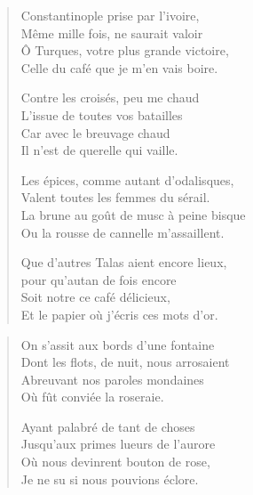 \begin{verse}
Constantinople prise par l’ivoire,\\
Même mille fois, ne saurait valoir\\
Ô Turques, votre plus grande victoire,\\
Celle du café que je m’en vais boire.

Contre les croisés, peu me chaud\\
L’issue de toutes vos batailles\\
Car avec le breuvage chaud\\
Il n’est de querelle qui vaille.

Les épices, comme autant d’odalisques,\\
Valent toutes les femmes du sérail.\\
La brune au goût de musc à peine bisque\\
Ou la rousse de cannelle m’assaillent.

Que d’autres Talas aient encore lieux,\\
 pour qu’autan de fois encore\\
Soit notre ce café délicieux,\\
Et le papier où j’écris ces mots d’or.
\end{verse}

\begin{verse}
On s’assit aux bords d’une fontaine\\
Dont les flots, de nuit, nous arrosaient\\
Abreuvant nos paroles mondaines\\
Où fût conviée la roseraie.

Ayant palabré de tant de choses\\
Jusqu’aux primes lueurs de l’aurore\\
Où nous devinrent bouton de rose,\\
Je ne su si nous pouvions éclore.
\end{verse}

